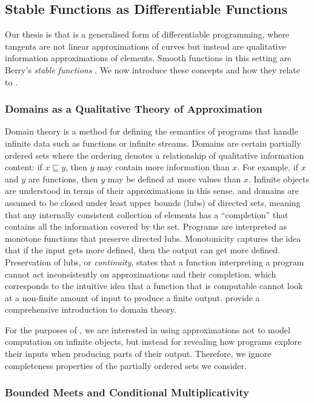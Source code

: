 \subsection{Stable Functions as Differentiable Functions}

Our thesis is that \GPS is a generalised form of differentiable programming, where tangents are not linear approximations of curves but instead are qualitative information approximations of elements. Smooth functions in this setting are Berry's \emph{stable functions} \cite{berry79,berry82}. We now introduce these concepts and how they relate to \GPS.

\subsubsection{Domains as a Qualitative Theory of Approximation}

Domain theory is a method for defining the semantics of programs that
handle infinite data such as functions or infinite streams. Domains
are certain partially ordered sets where the ordering denotes a
relationship of qualitative information content: if $x \sqsubseteq y$,
then $y$ may contain more information than $x$. For example, if $x$
and $y$ are functions, then $y$ may be defined at more values than
$x$. Infinite objects are understood in terms of their approximations
in this sense, and domains are assumed to be closed under least upper
bounds (lubs) of directed sets, meaning that any internally consistent
collection of elements has a ``completion'' that contains all the
information covered by the set. Programs are interpreted as monotone
functions that preserve directed lubs. Monotonicity captures the idea
that if the input gets more defined, then the output can get more
defined. Preservation of lubs, or \emph{continuity}, states that a
function interpreting a program cannot act inconsistently on
approximations and their completion, which corresponds to the
intuitive idea that a function that is computable cannot look at a
non-finite amount of input to produce a finite output. \citet{abramsky-jung} provide a comprehensive introduction to domain theory.

For the purposes of \GPS, we are interested in using
approximations not to model computation on infinite objects, but instead
for revealing how programs explore their inputs when producing parts
of their output. Therefore, we ignore completeness properties of the
partially ordered sets we consider.

\subsubsection{Bounded Meets and Conditional Multiplicativity}
\label{sec:bounded-meets-and-cm}

